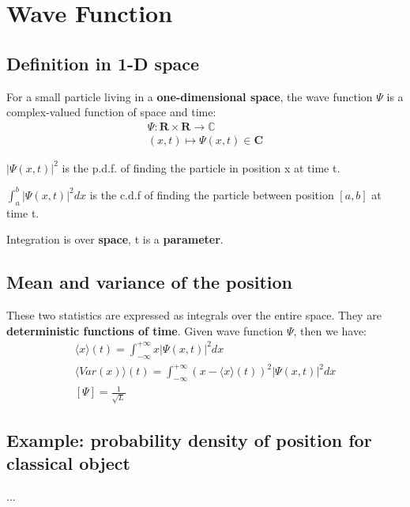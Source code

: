 \section{Wave Function}
\subsection{Definition in 1-D space}
\begin{definition}
    For a small particle living in a \textbf{{one-dimensional space}}, the wave function $\Psi$ is a complex-valued function of space and time:
    $$
        \begin{gathered}
            \Psi: \mathbf{R} \times \mathbf{R} \rightarrow \mathbb{C} \\
            (x, t) \mapsto \Psi(x, t) \in \mathbf{C}
        \end{gathered}
    $$
\end{definition}

\begin{remark}
    $
        |\Psi(x,t)|^2
    $
    is the p.d.f. of finding the particle in position x at time t.
\end{remark}
\begin{remark}
    $
        \int_{a}^{b} |\Psi(x,t)|^2 dx
    $
    is the c.d.f of finding the particle between position $[a, b]$ at time t.
\end{remark}
\begin{remark}
    Integration is over \textbf{space}, t is a \textbf{parameter}.
\end{remark}
\newpage
\subsection{Mean and variance of the position}
These two statistics are expressed as integrals over the entire space. They are \textbf{deterministic functions of time}. Given wave function $\Psi$, then we have: 
$$
\begin{gathered}
    \langle x\rangle(t)=\int_{-\infty}^{+\infty} x|\Psi(x, t)|^{2} d x\\
    \langle Var(x)\rangle(t)=\int_{-\infty}^{+\infty}(x-\langle x\rangle(t))^{2}|\Psi(x, t)|^{2} d x\\
    [\Psi] = \frac{1}{\sqrt{L}}
\end{gathered}
$$

\subsection{Example: probability density of position for classical object}
...